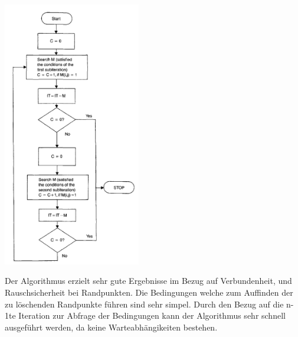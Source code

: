 \includegraphics[width=6cm]{Res/AlgUebersicht.png}


Der Algorithmus erzielt sehr gute Ergebnisse im Bezug auf Verbundenheit, und Rauschsicherheit bei Randpunkten. Die Bedingungen welche zum Auffinden der zu löschenden Randpunkte führen sind sehr simpel. Durch den Bezug auf die n-1te Iteration zur Abfrage der Bedingungen kann der Algorithmus sehr schnell ausgeführt werden, da keine Warteabhängikeiten bestehen.
